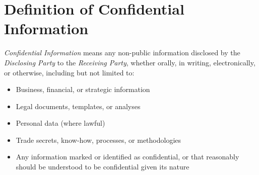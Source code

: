 
\section{Definition of Confidential Information}
\label{sec:definition}

\textit{Confidential Information} means any non-public information disclosed by the \textit{Disclosing Party} to the \textit{Receiving Party}, whether orally, in writing, electronically, or otherwise, including but not limited to:

\begin{itemize}
  \item Business, financial, or strategic information
  \item Legal documents, templates, or analyses
  \item Personal data (where lawful)
  \item Trade secrets, know-how, processes, or methodologies
  \item Any information marked or identified as confidential, or that reasonably should be understood to be confidential given its nature
\end{itemize}

